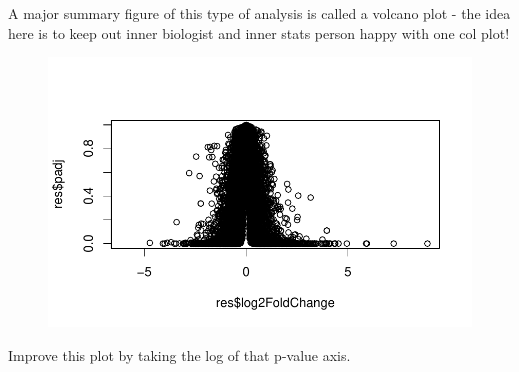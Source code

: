 \documentclass[
  letterpaper,
  DIV=11,
  numbers=noendperiod]{scrartcl}
\newenvironment{Shaded}{\begin{snugshade}}{\end{snugshade}}
\newcommand{\FunctionTok}[1]{\textcolor[rgb]{0.28,0.35,0.67}{#1}}
\newcommand{\NormalTok}[1]{\textcolor[rgb]{0.00,0.23,0.31}{#1}}
\newcommand{\SpecialCharTok}[1]{\textcolor[rgb]{0.37,0.37,0.37}{#1}}
\begin{document}
A major summary figure of this type of analysis is called a volcano plot
- the idea here is to keep out inner biologist and inner stats person
happy with one col plot!

\begin{Shaded}
\end{Shaded}

\begin{figure}[H]

{\centering \includegraphics{class12_files/figure-pdf/unnamed-chunk-34-1.pdf}

}

\end{figure}

Improve this plot by taking the log of that p-value axis.

\begin{Shaded}
\end{Shaded}
\end{document}

